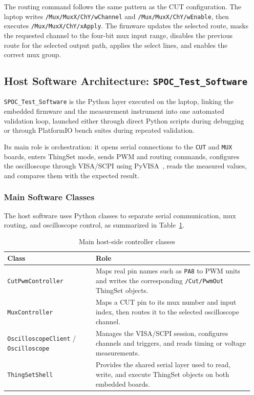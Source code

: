 The routing command follows the same pattern as the CUT configuration.
The laptop writes \texttt{/Mux/MuxX/ChY/wChannel} and
\texttt{/Mux/MuxX/ChY/wEnable}, then executes
\texttt{/Mux/MuxX/ChY/xApply}. The firmware updates the selected route,
masks the requested channel to the four-bit mux input range, disables
the previous route for the selected output path, applies the select
lines, and enables the correct mux group. 


\subsection{Host Software Architecture: \texttt{SPOC\_Test\_Software}}
\label{host-software-architecture-spoc-test-software}

\texttt{SPOC\_Test\_Software} is the Python layer executed on the
laptop, linking the embedded firmware and the measurement instrument
into one automated validation loop, launched either through direct
Python scripts during debugging or through PlatformIO bench suites
during repeated validation.

Its main role is orchestration: it opens serial connections to the
\texttt{CUT} and \texttt{MUX} boards, enters ThingSet mode, sends PWM
and routing commands, configures the oscilloscope through VISA/SCPI
using PyVISA~\cite{rigol_mho900_programming,pyvisa_docs}, reads the
measured values, and compares them with the expected result.

\subsubsection{Main Software Classes}
\label{main-software-classes}

The host software uses Python classes to separate serial communication,
mux routing, and oscilloscope control, as summarized in
Table~\ref{tab:host_controller_classes}.

\begin{table}[H]
\centering
\caption{Main host-side controller classes}
\label{tab:host_controller_classes}
\small
\begin{tabularx}{\textwidth}{|p{4.5cm}|X|}
\hline
\textbf{Class} & \textbf{Role} \\ \hline
\texttt{CutPwmController} & Maps real pin names such as \texttt{PA8} to PWM units and writes the corresponding \texttt{/Cut/PwmOut} ThingSet objects. \\ \hline
\texttt{MuxController} & Maps a CUT pin to its mux number and input index, then routes it to the selected oscilloscope channel. \\ \hline
\texttt{OscilloscopeClient} / \texttt{Oscilloscope} & Manages the VISA/SCPI session, configures channels and triggers, and reads timing or voltage measurements. \\ \hline
\texttt{ThingSetShell} & Provides the shared serial layer used to read, write, and execute ThingSet objects on both embedded boards. \\ \hline
\end{tabularx}
\normalsize
\end{table}

